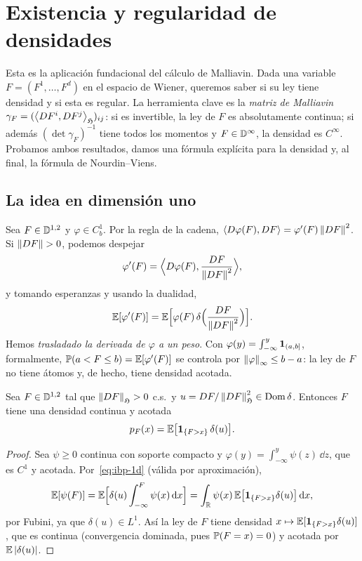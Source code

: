 \chapter{Existencia y regularidad de densidades}\label{cap:densidades}

\begin{panorama}
Esta es la aplicación fundacional del cálculo de Malliavin. Dada una variable $F=
(F^1,\dots,F^d)$ en el espacio de Wiener, queremos saber si su ley tiene densidad y si esta
es regular. La herramienta clave es la \emph{matriz de Malliavin} $\gamma_F=(\ip{DF^i}{DF^j}_\Hf)_{ij}$: si
es invertible, la ley de $F$ es absolutamente continua; si además $(\det\gamma_F)^{-1}$ tiene todos
los momentos y $F\in\D^\infty$, la densidad es $C^\infty$. Probamos ambos resultados, damos una
fórmula explícita para la densidad y, al final, la fórmula de Nourdin--Viens.
\end{panorama}

\section{La idea en dimensión uno}
Sea $F\in\D^{1,2}$ y $\varphi\in C_b^1$. Por la regla de la cadena, $\ip{D\varphi(F)}{DF}=\varphi'(F)\norm{DF}^2$. Si $\norm{DF}>0$,
podemos despejar
\[
  \varphi'(F)=\Big\langle D\varphi(F),\frac{DF}{\norm{DF}^2}\Big\rangle,
\]
y tomando esperanzas y usando la dualidad,
\begin{equation}\label{eq:ibp-1d}
  \E[\varphi'(F)]=\E\Big[\varphi(F)\,\delta\Big(\frac{DF}{\norm{DF}^2}\Big)\Big].
\end{equation}
Hemos \emph{trasladado la derivada de $\varphi$ a un peso}. Con $\varphi(y)=\int_{-\infty}^y\ind_{(a,b]}$, formalmente, $\P(a<F\le
b)=\E[\varphi'(F)]$ se controla por $\norm{\varphi}_\infty\le b-a$: la ley de $F$ no tiene átomos y, de hecho, tiene
densidad acotada.

\begin{teorema}\label{teo:densidad}
Sea $F\in\D^{1,2}$ tal que $\norm{DF}_\Hf>0$ c.s.\ y $u=
DF/\norm{DF}^2_\Hf\in\Dom\delta$. Entonces $F$ tiene una densidad continua y acotada
\[
  p_F(x)=\E\big[\ind_{\{F>x\}}\,\delta(u)\big].
\]
\end{teorema}

\begin{proof}
Sea $\psi\ge0$ continua con soporte compacto y $\varphi(y)=\int_{-\infty}^y\psi(z)\,\dd z$, que es $C^1$ y
acotada. Por~\eqref{eq:ibp-1d} (válida por aproximación),
\[
  \E[\psi(F)]=\E\Big[\delta(u)\int_{-\infty}^F\psi(x)\,\dd x\Big]=\int_\R\psi(x)\,\E\big[\ind_{\{F>x\}}\delta(u)\big]\,\dd x,
\]
por Fubini, ya que $\delta(u)\in L^1$. Así la ley de $F$ tiene densidad $x\mapsto\E[\ind_{\{F>x\}}\delta(u)]$, que es continua
(convergencia dominada, pues $\P(F=x)=0$) y acotada por $\E\abs{\delta(u)}$.
\end{proof}

